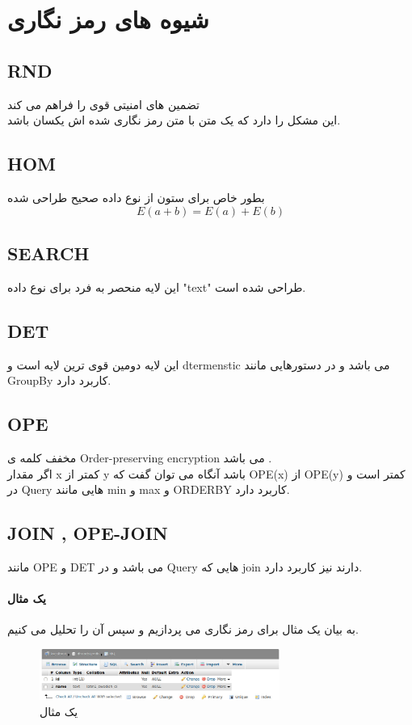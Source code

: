 \documentclass[a4paper]{article}
\begin{document}
			\section{شیوه های رمز نگاری}
			\subsection{RND}
			تضمین های امنیتی قوی را فراهم می کند \\
			این مشکل را دارد که یک متن با متن رمز نگاری شده اش یکسان باشد.
			\subsection{HOM}
			بطور خاص برای ستون از نوع داده صحیح طراحی شده 
			$$E(a+b) = E(a)+E(b)$$
			\subsection{SEARCH}
			این لایه منحصر به فرد برای نوع داده "text"
			طراحی شده است.
			\subsection{DET}
			این لایه دومین قوی ترین لایه است و 
			dtermenstic
			می باشد و در دستورهایی مانند 
			GroupBy
			کاربرد دارد. 
			\subsection{OPE}
			مخفف کلمه ی 
			Order-preserving encryption
			می باشد .\\
			اگر مقدار 
			x
			کمتر از 
			y
			باشد آنگاه می توان گفت که 
			OPE(x)
			از
			OPE(y)
			کمتر است و در 
			Query
			هایی مانند min 
			و
			max
			و 
			ORDERBY
			کاربرد دارد.
			\subsection{JOIN , OPE-JOIN}
			مانند
			OPE
			و
DET
 می باشد و در 
 Query
 هایی که join
 دارند نیز کاربرد دارد.			
			\paragraph{یک مثال}
			به بیان یک مثال برای رمز نگاری می پردازیم و سپس آن را تحلیل می کنیم.
			
				\begin{figure}[h]
					\centering
					\includegraphics[width=0.7\textwidth]{im4.jpg}
					\caption{یک مثال}
				\end{figure}
			
\end{document}
